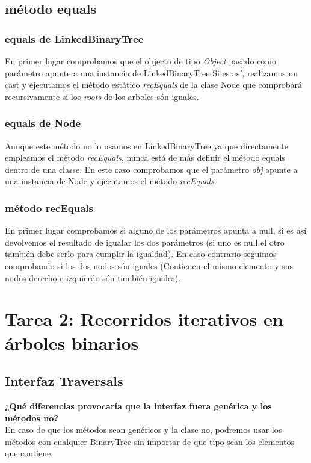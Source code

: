 \documentclass{article}
\begin{document}
    \subsection{método equals}
        \subsubsection{equals de LinkedBinaryTree}
            En primer lugar comprobamos que el objecto de tipo \textit{Object} pasado como parámetro apunte a una instancia de LinkedBinaryTree
            Si es así, realizamos un cast y ejecutamos el método estático \textit{recEquals} de la clase Node que comprobará recursivamente si los \textit{roots} de los arboles són iguales.
    \subsubsection{equals de Node}
            Aunque este método no lo usamos en LinkedBinaryTree ya que directamente empleamos el método \textit{recEquals}, nunca está de más definir el método equals dentro de una classe.
            En este caso comprobamos que el parámetro \textit{obj} apunte a una instancia de Node y 
            ejecutamos el método \textit{recEquals}
    \subsubsection{método recEquals}
            En primer lugar comprobamos si alguno de los parámetros apunta a null, si es así devolvemos el resultado de igualar los dos parámetros (si uno es null el otro también debe serlo para cumplir la igualdad).
            En caso contrario seguimos comprobando si los dos nodos són iguales (Contienen el mismo elemento y sus nodos derecho e izquierdo són también iguales).
            \newline
            
\section{Tarea 2: Recorridos iterativos en árboles binarios}

    \subsection{Interfaz Traversals}
    \textbf{ ¿Qué diferencias provocaría que la interfaz fuera genérica y los
        métodos no?}\\
            En caso de que los métodos sean genéricos y la clase no, podremos usar los métodos con cualquier BinaryTree sin importar de que tipo sean los elementos que contiene.
            
\end{document}
